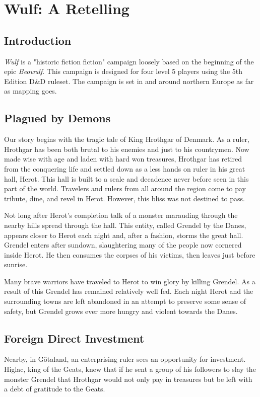 \documentclass[10pt,twoside,twocolumn,openany]{book}
\begin{document}
\selectfont %


\chapter{Wulf: A Retelling}

\section{Introduction}
\textit{Wulf} is a "historic fiction fiction" campaign loosely based on the beginning of the epic \textit{Beowulf}. This campaign is designed for four level 5 players using the 5th Edition D\&D ruleset. The campaign is set in and around northern Europe as far as mapping goes.

\section{Plagued by Demons}
Our story begins with the tragic tale of King Hrothgar of Denmark. As a ruler, Hrothgar has been both brutal to his enemies and just to his countrymen. Now made wise with age and laden with hard won treasures, Hrothgar has retired from the conquering life and settled down as a less hands on ruler in his great hall, Herot. This hall is built to a scale and decadence never before seen in this part of the world. Travelers and rulers from all around the region come to pay tribute, dine, and revel in Herot. However, this bliss was not destined to pass. 

Not long after Herot's completion talk of a monster marauding through the nearby hills spread through the hall. This entity, called Grendel by the Danes, appears closer to Herot each night and, after a fashion, storms the great hall. Grendel enters after sundown, slaughtering many of the people now cornered inside Herot. He then consumes the corpses of his victims, then leaves just before sunrise.

Many brave warriors have traveled to Herot to win glory by killing Grendel. As a result of this Grendel has remained relatively well fed. Each night Herot and the surrounding towns are left abandoned in an attempt to preserve some sense of safety, but Grendel grows ever more hungry and violent towards the Danes.

\section{Foreign Direct Investment}
Nearby, in G{\"o}taland, an enterprising ruler sees an opportunity for investment. Higlac, king of the Geats, knew that if he sent a group of his followers to slay the monster Grendel that Hrothgar would not only pay in treasures but be left with a debt of gratitude to the Geats.
\end{document}
